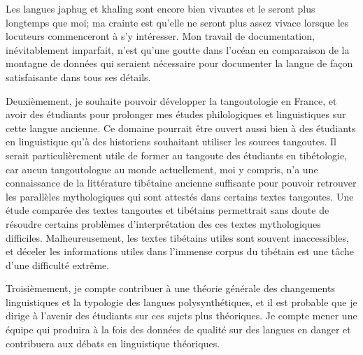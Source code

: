 \documentclass[oldfontcommands,oneside,a4paper,11pt]{memoir}
\begin{document}
Les langues japhug et khaling sont encore bien vivantes et le seront plus longtemps que moi; ma crainte est qu'elle ne seront plus assez vivace lorsque les locuteurs commenceront à s'y intéresser. Mon travail de documentation, inévitablement imparfait, n'est qu'une goutte dans l'océan en comparaison de la montagne de données qui seraient nécessaire pour documenter la langue de façon satisfaisante dans tous ses détails. 

Deuxièmement, je souhaite   pouvoir développer la tangoutologie en France, et avoir des étudiants pour prolonger mes études philologiques et linguistiques sur cette langue ancienne. Ce domaine pourrait être ouvert aussi bien à des étudiants en linguistique qu'à des historiens souhaitant utiliser les sources tangoutes. Il serait particulièrement utile de former au tangoute des étudiants en tibétologie, car aucun tangoutologue au monde actuellement, moi y compris, n'a une connaissance de la littérature tibétaine ancienne suffisante pour pouvoir retrouver les parallèles mythologiques qui sont attestés dans certains textes tangoutes. Une étude comparée des textes tangoutes et tibétains permettrait sans doute de résoudre certains problèmes d'interprétation des ces textes mythologiques difficiles. Malheureusement, les textes tibétains utiles sont souvent inaccessibles, et déceler les informations utiles dans l'immense corpus du tibétain est une tâche d'une difficulté extrême. 
 

Troisièmement, je compte  contribuer à une théorie générale des changements linguistiques et la typologie des langues polysynthétiques, et il est probable que je dirige à l'avenir des étudiants sur ces sujets plus théoriques. Je compte mener une équipe qui produira à la fois des données de qualité sur des langues en danger et contribuera aux débats   en linguistique théoriques.






\pagebreak
	\tableofcontents
\end{document}
